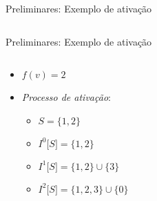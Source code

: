 \begin{frame}{Preliminares: Exemplo de ativação}
\begin{columns}
\begin{column}{.45\textwidth}
        \end{column}
    \end{columns}
\end{frame}


\begin{frame}{Preliminares: Exemplo de ativação}
    \begin{columns}
        \begin{column}{.45\textwidth}
            \begin{itemize}
                \item $f(v)=2$
                      \tightlist
                \item \emph{Processo de ativação}:
                      \begin{itemize}
                          \tightlist
                          \item $S=\{1,2\}$
                          \item \(I^0{[}S{]}=\{1,2\}\)
                          \item $I^1{[}S{]}=\{1,2\} \cup \{3\}$
                          \item $I^2{[}S{]}=\{1,2,3\} \cup \{0\}$
                      \end{itemize}
            \end{itemize}
        \end{column}
        \begin{column}{.45\textwidth}
            \begin{tikzpicture}[scale=0.7]

\end{tikzpicture}
\end{column}
\end{columns}
\end{frame}
